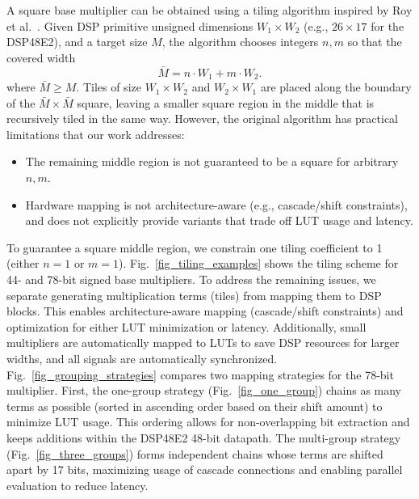 \documentclass[sigconf,9pt,review]{acmart}
\begin{document}
A square base multiplier can be obtained using a tiling algorithm inspired by Roy et al.~\cite{royTileMultiplicationEfficient2014}.
Given DSP primitive unsigned dimensions $W_1\times W_2$ (e.g., $26\times17$ for the DSP48E2), and a target size $M$,  the algorithm chooses integers $n,m$ so that the covered width
\[
\bar{M} = n \cdot  W_1  + m \cdot W_2 .
\]
where $\bar{M} \geq M$.
Tiles of size $W_1\times W_2$ and $W_2\times W_1$ are placed along the boundary of the $\bar{M}\times\bar{M}$ square, leaving a smaller square region in the middle that is recursively tiled in the same way.
However, the original algorithm has practical limitations that our work addresses:
\begin{itemize}
    \item The remaining middle region is not guaranteed to be a square for arbitrary $n,m$.
    \item Hardware mapping is not architecture-aware (e.g., cascade/shift constraints), and does not explicitly provide variants that trade off LUT usage and latency.
\end{itemize}

To guarantee a square middle region, we constrain one tiling coefficient to 1 (either $n=1$ or $m=1$).
Fig.~\ref{fig_tiling_examples} shows the tiling scheme for 44- and 78-bit signed base multipliers.
To address the remaining issues, we separate generating multiplication terms (tiles) from mapping them to DSP blocks.
This enables architecture-aware mapping (cascade/shift constraints) and optimization for either LUT minimization or latency.
Additionally, small multipliers are automatically mapped to LUTs to save DSP resources for larger widths, and all signals are automatically synchronized.
Fig.~\ref{fig_grouping_strategies} compares two mapping strategies for the 78-bit multiplier.
First, the one-group strategy (Fig.~\ref{fig_one_group}) chains as many terms as possible (sorted in ascending order based on their shift amount) to minimize LUT usage. 
This ordering allows for non-overlapping bit extraction and keeps additions within the DSP48E2 48-bit datapath.
The multi-group strategy (Fig.~\ref{fig_three_groups}) forms independent chains whose terms are shifted apart by 17 bits, maximizing usage of cascade connections and enabling parallel evaluation to reduce latency.
\end{document}
